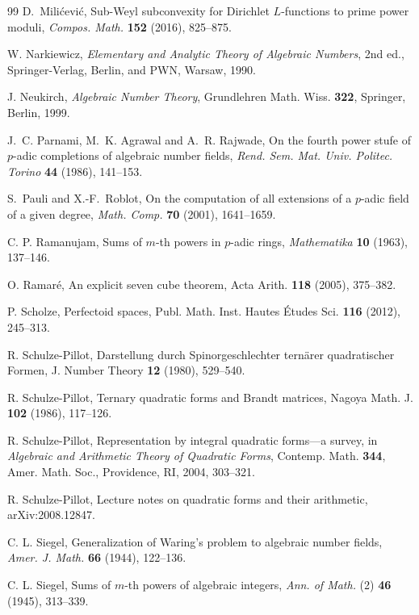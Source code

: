 \documentclass[11pt,letterpaper]{article}
\theoremstyle{definition}
\numberwithin{equation}{section}
\begin{document}
\begin{thebibliography}{99}
D.~Mili\'cevi\'c, Sub-Weyl subconvexity for Dirichlet $L$-functions to prime power moduli, \emph{Compos. Math.} \textbf{152} (2016), 825--875.

W. Narkiewicz, \emph{Elementary and Analytic Theory of Algebraic Numbers},
2nd ed., Springer-Verlag, Berlin, and PWN, Warsaw, 1990.

J. Neukirch, \emph{Algebraic Number Theory}, Grundlehren Math. Wiss. \textbf{322}, Springer, Berlin, 1999.

J.~C. Parnami, M.~K. Agrawal and A.~R. Rajwade,
On the fourth power stufe of $p$-adic completions of algebraic number fields,
\emph{Rend. Sem. Mat. Univ. Politec. Torino} \textbf{44} (1986), 141--153.

S.~Pauli and X.-F.~Roblot, On the computation of all extensions of a
$p$-adic field of a given degree, \emph{Math. Comp.} \textbf{70}
(2001), 1641--1659.

C. P. Ramanujam, Sums of $m$-th powers in $p$-adic rings,
\emph{Mathematika} \textbf{10} (1963), 137--146.

O. Ramar\'e, An explicit seven cube theorem, Acta Arith. \textbf{118} (2005), 375--382.

P. Scholze, Perfectoid spaces, Publ. Math. Inst. Hautes \'Etudes Sci. \textbf{116} (2012), 245--313.

R. Schulze-Pillot, Darstellung durch Spinorgeschlechter tern\"arer quadratischer Formen, J. Number Theory \textbf{12} (1980), 529--540.

R. Schulze-Pillot, Ternary quadratic forms and Brandt matrices, Nagoya Math. J. \textbf{102} (1986), 117--126.

R. Schulze-Pillot, Representation by integral quadratic forms---a survey, in \emph{Algebraic and Arithmetic Theory of Quadratic Forms}, Contemp. Math. \textbf{344}, Amer. Math. Soc., Providence, RI, 2004, 303--321.

R. Schulze-Pillot, Lecture notes on quadratic forms and their arithmetic, arXiv:2008.12847.

C. L. Siegel, Generalization of Waring's problem to algebraic
number fields, \emph{Amer. J. Math.} \textbf{66} (1944), 122--136.

C. L. Siegel, Sums of $m$-th powers of algebraic integers,
\emph{Ann. of Math.} (2) \textbf{46} (1945), 313--339.


\end{thebibliography}
\end{document}
